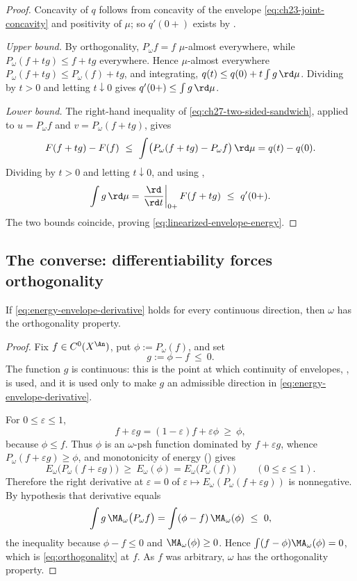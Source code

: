 \begin{proof}
Concavity of \(q\) follows from concavity of the envelope
\eqref{eq:ch23-joint-concavity} and positivity of \(\mu\); so \(q'(0+)\)
exists by .

\emph{Upper bound.}  By orthogonality, \(P_\omega f=f\) \(\mu\)-almost
everywhere, while \(P_\omega(f+tg)\leq f+tg\) everywhere.  Hence
\(\mu\)-almost everywhere
\(P_\omega(f+tg)\leq P_\omega(f)+tg\), and integrating,
\(q(t)\leq q(0)+t\int g\,\rd\mu\).  Dividing by \(t>0\) and letting
\(t\downarrow0\) gives \(q'(0+)\leq\int g\,\rd\mu\).

\emph{Lower bound.}  The right-hand inequality of
\eqref{eq:ch27-two-sided-sandwich}, applied to
\(u=P_\omega f\) and \(v=P_\omega(f+tg)\), gives
\[
 F(f+tg)-F(f)\ \leq\ \int\bigl(P_\omega(f+tg)-P_\omega f\bigr)\,\rd\mu
 =q(t)-q(0).
\]
Dividing by \(t>0\) and letting \(t\downarrow0\), and using
,
\[
 \int g\,\rd\mu
 =\left.\frac{\rd}{\rd t}\right|_{0+}F(f+tg)
 \ \leq\ q'(0+).
\]
The two bounds coincide, proving
\eqref{eq:linearized-envelope-energy}.
\end{proof}

\subsection{The converse: differentiability forces orthogonality}
\label{sec:ch27-converse}

\begin{proposition}\label{prop:differentiability-iff-orthogonality}
If \eqref{eq:energy-envelope-derivative} holds for every continuous
direction, then \(\omega\) has the orthogonality property.
\end{proposition}

\begin{proof}
Fix \(f\in C^0(X^{\An})\), put \(\phi:=P_\omega(f)\), and set
\[
 g:=\phi-f\ \leq\ 0 .
\]
The function \(g\) is continuous: this is the point at which continuity of
envelopes, , is used, and it is used only
to make \(g\) an admissible direction in
\eqref{eq:energy-envelope-derivative}.

For \(0\leq\varepsilon\leq1\),
\[
 f+\varepsilon g=(1-\varepsilon)f+\varepsilon\phi\ \geq\ \phi ,
\]
because \(\phi\leq f\).  Thus \(\phi\) is an \(\omega\)-psh function
dominated by \(f+\varepsilon g\), whence
\(P_\omega(f+\varepsilon g)\geq\phi\), and monotonicity of energy
() gives
\[
 E_\omega\bigl(P_\omega(f+\varepsilon g)\bigr)\ \geq\ E_\omega(\phi)
 =E_\omega\bigl(P_\omega(f)\bigr)
 \qquad(0\leq\varepsilon\leq1).
\]
Therefore the right derivative at \(\varepsilon=0\) of
\(\varepsilon\mapsto E_\omega(P_\omega(f+\varepsilon g))\) is nonnegative.
By hypothesis that derivative equals
\[
 \int g\,\MA_\omega\bigl(P_\omega f\bigr)
 =\int(\phi-f)\,\MA_\omega(\phi)\ \leq\ 0,
\]
the inequality because \(\phi-f\leq0\) and \(\MA_\omega(\phi)\geq0\).  Hence
\(\int(f-\phi)\MA_\omega(\phi)=0\), which is
\eqref{eq:orthogonality} at \(f\).  As \(f\) was arbitrary, \(\omega\) has
the orthogonality property.
\end{proof}

